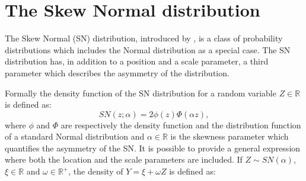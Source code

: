 \documentclass[11pt, oneside]{article}
\begin{document}
%

\section{The Skew Normal distribution} \label{sec:2}

The Skew Normal (SN) distribution, introduced by \cite{Azzalini1985}, is a class of probability distributions which includes the Normal distribution as a special case. The SN distribution has, in addition to a position and a scale parameter, a third parameter which describes the asymmetry of the distribution. 

Formally the density function of the SN distribution for a random variable $Z \in \mathbb R$ is defined as:
\begin{equation} \label{def:snd}
SN(z; \alpha) = 2\phi(z)\Phi(\alpha z),
\end{equation}
where $\phi$ and $\Phi$ are respectively the density function and the distribution function of a standard Normal distribution and $\alpha \in \mathbb R$ is the skewness parameter which quantifies the asymmetry of the SN. It is possible to provide a general expression where both the location and the scale parameters are included. If $Z \sim SN(\alpha)$, $\xi \in \mathbb R$ and $\omega \in \mathbb R^{+}$, the density of $Y = \xi + \omega Z$ is defined as:
\end{document}
